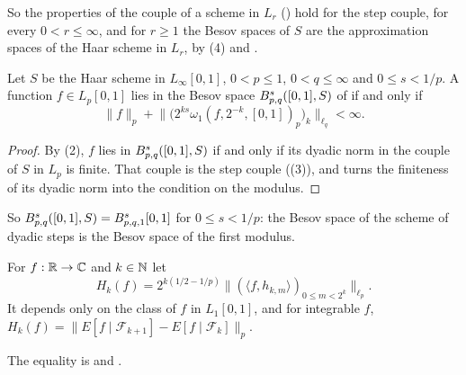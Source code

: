 So the properties of the couple of a scheme in $L_r$ () hold for the
step couple, for every $0 < r \leq \infty$, and for $r \geq 1$ the Besov spaces of $S$ are the
approximation spaces of the Haar scheme in $L_r$, by (4) and .

\begin{corollary}
\label{cor:steps-besov-space}
\leanok
{}
Let $S$ be the Haar scheme in $L_\infty[0, 1]$, $0 < p \leq 1$, $0 < q \leq \infty$ and
$0 \leq s < 1/p$. A function $f \in L_p[0, 1]$ lies in the Besov space
$B^{s}_{p,q}([0, 1], S)$ of  if and only if
\[
  \|f\|_p + \bigl\| \bigl( 2^{ks} \omega_1(f, 2^{-k}, [0, 1])_p \bigr)_k \bigr\|_{\ell_q}
  < \infty .
\]
\end{corollary}

\begin{proof}
\leanok
{}
By (2), $f$ lies in $B^{s}_{p,q}([0, 1], S)$ if and only if its
dyadic norm in the couple of $S$ in $L_p$ is finite. That couple is the step couple
((3)), and  turns the finiteness
of its dyadic norm into the condition on the modulus.
\end{proof}

So $B^{s}_{p,q}([0, 1], S) = B^s_{p,q,1}[0, 1]$ for $0 \leq s < 1/p$: the Besov space of the
scheme of dyadic steps is the Besov space of the first modulus.

\begin{definition}
\label{def:haar-level-norm}
\leanok
{}
For $f : \mathbb{R} \to \mathbb{C}$ and $k \in \mathbb{N}$ let
\[
  H_k(f) = 2^{k(1/2 - 1/p)} \bigl\| (\langle f, h_{k,m} \rangle)_{0 \leq m < 2^k}
  \bigr\|_{\ell_p} .
\]
It depends only on the class of $f$ in $L_1[0, 1]$, and for integrable $f$,
$H_k(f) = \|E[f \mid \mathcal{F}_{k+1}] - E[f \mid \mathcal{F}_k]\|_p$.
\end{definition}

The equality is  and .

